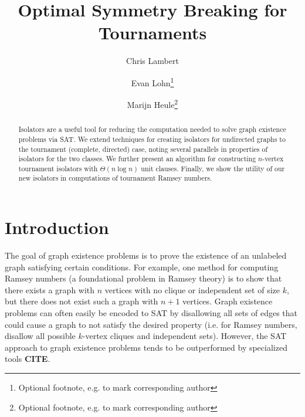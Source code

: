 \documentclass[a4paper,UKenglish,cleveref, autoref, thm-restate]{lipics-v2021}
\title{Optimal Symmetry Breaking for Tournaments}
\author{Chris Lambert}{Dummy University Computing Laboratory, [optional: Address], Country \and My second affiliation, Country \and \url{http://www.myhomepage.edu} }{johnqpublic@dummyuni.org}{}{(Optional) author-specific funding acknowledgements}%
\author{Evan Lohn\footnote{Optional footnote, e.g. to mark corresponding author}}{Department of Informatics, Dummy College, [optional: Address], Country}{joanrpublic@dummycollege.org}{}{[funding]}
\author{Marijn Heule\footnote{Optional footnote, e.g. to mark corresponding author}}{Department of Informatics, Dummy College, [optional: Address], Country}{joanrpublic@dummycollege.org}{}{[funding]}
\begin{document}
\maketitle

%
\begin{abstract}

Isolators are a useful tool for reducing the computation needed to solve graph existence problems via SAT.  We extend techniques for creating isolators for undirected graphs to the tournament (complete, directed) case, noting several parallels in properties of isolators for the two classes. We further present an algorithm for constructing $n$-vertex tournament isolators with $\Theta(n \log n)$ unit clauses. Finally, we show the utility of our new isolators in computations of tournament Ramsey numbers.

\end{abstract}
%
%



\section{Introduction}


The goal of graph existence problems is to prove the existence of an unlabeled graph satisfying certain conditions. For example, one method for computing Ramsey numbers (a foundational problem in Ramsey theory) is to show that there exists a graph with $n$ vertices with no clique or independent set of size $k$, but there does not exist such a graph with $n+1$ vertices. Graph existence problems can often easily be encoded to SAT by disallowing all sets of edges that could cause a graph to not satisfy the desired property (i.e. for Ramsey numbers, disallow all possible $k$-vertex cliques and independent sets). However, the SAT approach to graph existence problems tends to be outperformed by specialized tools \textbf{CITE}. 
\end{document}
